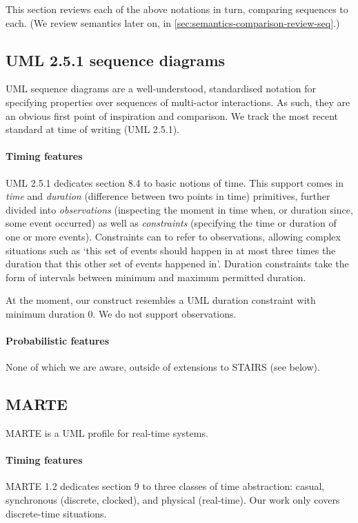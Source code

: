 
This section reviews each of the above notations in turn, comparing
\langname{} sequences to each.  (We review semantics
later on, in \cref{sec:semantics-comparison-review-seq}.)

\subsection{UML 2.5.1 sequence diagrams}

UML sequence diagrams are a well-understood, standardised notation for
specifying properties over sequences of multi-actor interactions.  As such, they
are an obvious first point of inspiration and comparison.  We track the most
recent standard at time of writing (UML 2.5.1).

\paragraph{Timing features}
UML 2.5.1 dedicates section 8.4 to basic notions of time.  This
support comes in \emph{time} and \emph{duration} (difference between two points
in time) primitives, further divided into \emph{observations} (inspecting the
moment in time when, or duration since, some event occurred) as well as
\emph{constraints} (specifying the time or duration of one or more events).
Constraints can to refer to observations, allowing complex situations such as
`this set of events should happen in at most three times the duration that
this other set of events happened in'.  Duration constraints take the
form of intervals between minimum and maximum permitted duration.

At the moment, our \mdeadlinestep{} construct resembles a UML duration
constraint with minimum duration \(0\).  We do not support observations.

\paragraph{Probabilistic features}
None of which we are aware, outside of extensions to STAIRS (see below).

\subsection{MARTE}

MARTE is a UML profile for real-time systems.

\paragraph{Timing features}
MARTE 1.2 dedicates section 9 to three classes of time abstraction:
casual, synchronous (discrete, clocked), and physical (real-time).  Our work
only covers discrete-time
situations.

